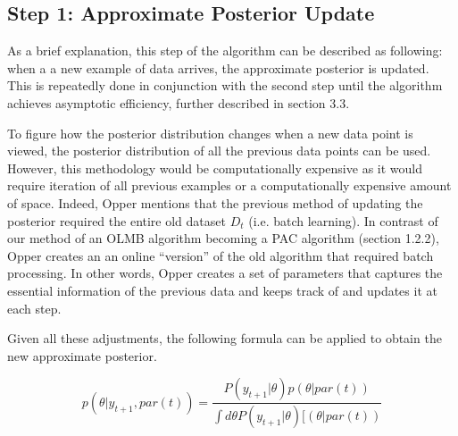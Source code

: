 																																																																																																										\subsection{Step 1: Approximate Posterior Update}
																																																																																																										    As a brief explanation, this step of the algorithm can be described as following: when a a new example of data arrives, the approximate posterior is updated. This is repeatedly done in conjunction with the second step until the algorithm achieves asymptotic efficiency, further described in section 3.3. \vspace{4mm}
																																																																																																											    
																																																																																																												    \noindent To figure how the posterior distribution changes when a new data point is viewed, the posterior distribution of all the previous data points can be used. However, this methodology would be computationally expensive as it would require iteration of all previous examples or a computationally expensive amount of space. Indeed, Opper mentions that the previous method of updating the posterior required the entire old dataset $D_t$ (i.e. batch learning). In contrast of our method of an OLMB algorithm becoming a PAC algorithm (section 1.2.2), Opper creates an an online ``version'' of the old algorithm that required batch processing. In other words, Opper creates a set of parameters that captures the essential information of the previous data and keeps track of and updates it at each step. \vspace{4mm}
																																																																																																													    
																																																																																																														    \noindent Given all these adjustments, the following formula can be applied to obtain the new approximate posterior.
																																																																																																															    
																																																																																																																    $$ p(\theta | y_{t+1}, par(t)) = \frac{P(y_{t+1}|\theta)p(\theta | par(t))}{\int d\theta P(y_{t+1}|\theta)[(\theta | par(t))}$$



